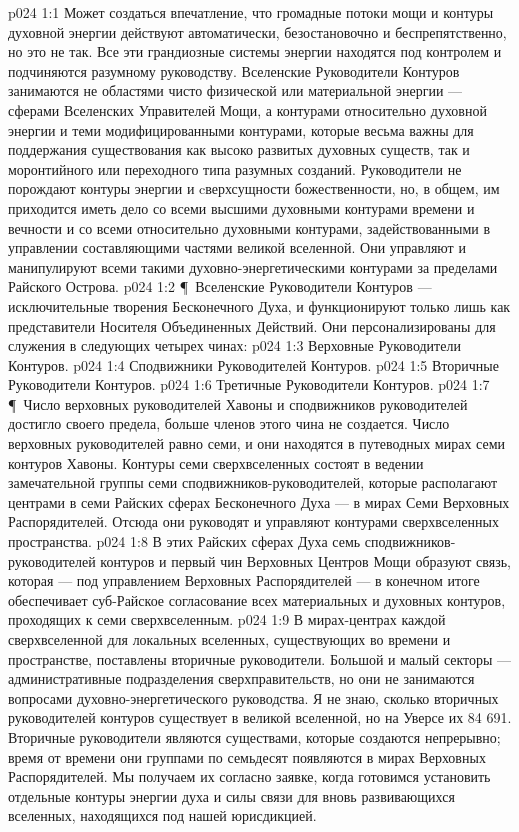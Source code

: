 \vs p024 1:1 Может создаться впечатление, что громадные потоки мощи и контуры духовной энергии действуют автоматически, безостановочно и беспрепятственно, но это не так. Все эти грандиозные системы энергии находятся под контролем и подчиняются разумному руководству. Вселенские Руководители Контуров занимаются не областями чисто физической или материальной энергии --- сферами Вселенских Управителей Мощи, а контурами относительно духовной энергии и теми модифицированными контурами, которые весьма важны для поддержания существования как высоко развитых духовных существ, так и моронтийного или переходного типа разумных созданий. Руководители не порождают контуры энергии и cверхсущности божественности, но, в общем, им приходится иметь дело со всеми высшими духовными контурами времени и вечности и со всеми относительно духовными контурами, задействованными в управлении составляющими частями великой вселенной. Они управляют и манипулируют всеми такими духовно\hyp{}энергетическими контурами за пределами Райского Острова.
\vs p024 1:2 \P\ Вселенские Руководители Контуров --- исключительные творения Бесконечного Духа, и функционируют только лишь как представители Носителя Объединенных Действий. Они персонализированы для служения в следующих четырех чинах:
\vs p024 1:3 \bibnobreakspace Верховные Руководители Контуров.
\vs p024 1:4 \bibnobreakspace Сподвижники Руководителей Контуров.
\vs p024 1:5 \bibnobreakspace Вторичные Руководители Контуров.
\vs p024 1:6 \bibnobreakspace Третичные Руководители Контуров.
\vs p024 1:7 \P\ Число верховных руководителей Хавоны и сподвижников руководителей достигло своего предела, больше членов этого чина не создается. Число верховных руководителей равно семи, и они находятся в путеводных мирах семи контуров Хавоны. Контуры семи сверхвселенных состоят в ведении замечательной группы семи сподвижников\hyp{}руководителей, которые располагают центрами в семи Райских сферах Бесконечного Духа --- в мирах Семи Верховных Распорядителей. Отсюда они руководят и управляют контурами сверхвселенных пространства.
\vs p024 1:8 В этих Райских сферах Духа семь сподвижников\hyp{}руководителей контуров и первый чин Верховных Центров Мощи образуют связь, которая --- под управлением Верховных Распорядителей --- в конечном итоге обеспечивает суб\hyp{}Райское согласование всех материальных и духовных контуров, проходящих к семи сверхвселенным.
\vs p024 1:9 В мирах\hyp{}центрах каждой сверхвселенной для локальных вселенных, существующих во времени и пространстве, поставлены вторичные руководители. Большой и малый секторы --- административные подразделения сверхправительств, но они не занимаются вопросами духовно\hyp{}энергетического руководства. Я не знаю, сколько вторичных руководителей контуров существует в великой вселенной, но на Уверсе их 84 691. Вторичные руководители являются существами, которые создаются непрерывно; время от времени они группами по семьдесят появляются в мирах Верховных Распорядителей. Мы получаем их согласно заявке, когда готовимся установить отдельные контуры энергии духа и силы связи для вновь развивающихся вселенных, находящихся под нашей юрисдикцией.
